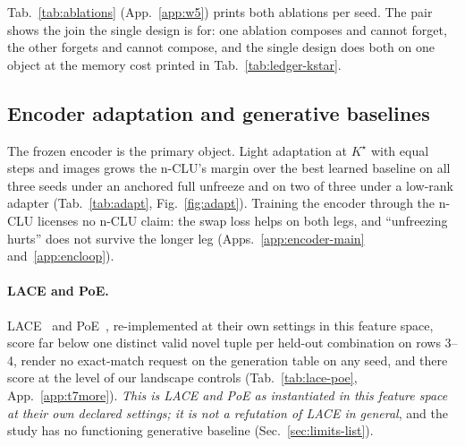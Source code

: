 \documentclass{article} %
\newcommand{\Kstar}{\ensuremath{K^{\star}}}
\begin{document}
Tab.~\ref{tab:ablations} (App.~\ref{app:w5}) prints both ablations per seed. The pair shows
the join the single design is for: one ablation composes and cannot
forget, the other forgets and cannot compose, and the single design does both on one object at
the memory cost printed in Tab.~\ref{tab:ledger-kstar}.

\subsection{Encoder adaptation and generative baselines}
\label{sec:adapt}\label{sec:bard}

The frozen encoder is the primary object. Light adaptation at $\Kstar$ with equal steps and
images grows the n-CLU's margin over the best learned baseline on all three seeds under an
anchored full unfreeze and on two
of three under a low-rank adapter (Tab.~\ref{tab:adapt}, Fig.~\ref{fig:adapt}). %
Training the encoder through the n-CLU licenses no n-CLU claim: the swap loss helps on both legs,
and ``unfreezing hurts'' does not survive the longer leg (Apps.~\ref{app:encoder-main}
and~\ref{app:encloop}).

\paragraph{LACE and PoE.}
LACE~\citep{nie_controllable_2021} and PoE~\citep{hinton_training_2002}, re-implemented at their own
settings in this feature space, score far below one distinct valid novel tuple per held-out combination %
on rows 3--4, render no exact-match request on the generation table on any seed, and there score at
the level of our landscape controls
(Tab.~\ref{tab:lace-poe}, App.~\ref{app:t7more}). \emph{This is LACE and PoE as instantiated in
this feature space at their own declared settings; it is not a refutation of LACE in general}, and
the study has no functioning generative baseline (Sec.~\ref{sec:limits-list}).
\end{document}
